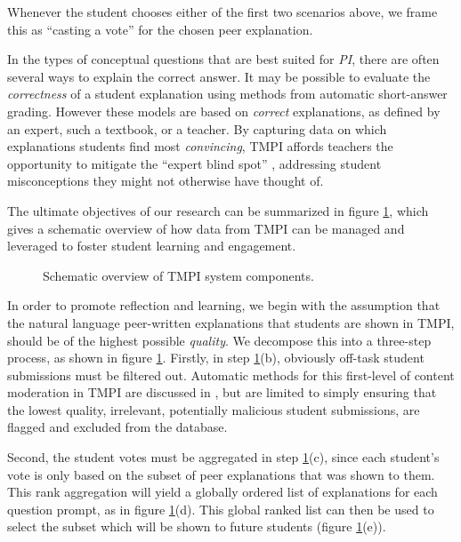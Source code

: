 \documentclass[notitlepage,12pt]{jedm}
\begin{document}
Whenever the student chooses either of the first two scenarios above, we 
frame this as ``casting a vote'' for the chosen peer explanation.

In the types of conceptual questions that are best suited for \textit{PI}, 
there are often several ways to explain the correct answer.
It may be possible to evaluate the \textit{correctness} of a student 
explanation using methods from automatic short-answer grading. 
However these models are based on \textit{correct} explanations, as defined by 
an expert, such a textbook, or a teacher.
By capturing data on which explanations students find most \textit{convincing}, 
TMPI affords teachers the opportunity to mitigate the ``expert blind spot'' 
\cite{nathan_expert_2001}, addressing student misconceptions they might not 
otherwise have thought of.

The ultimate objectives of our research can be summarized in figure  
\ref{fig:tmpi_research}, which gives a schematic overview of how data from TMPI 
can be managed and leveraged to foster student learning and engagement.
 
\begin{figure}[H]
	\centering
	\def\svgscale{0.70}
	
	\caption{
		Schematic overview of TMPI system components.
		 }
	\label{fig:tmpi_research}
\end{figure}

In order to promote reflection and learning, we begin with the assumption that 
the natural language peer-written explanations that students are shown in TMPI, 
should be of the highest possible \textit{quality}.
We decompose this into a three-step process, as shown in figure 
\ref{fig:tmpi_research}. 
Firstly, in step \ref{fig:tmpi_research}(b), obviously off-task 
student submissions must be filtered out. 
Automatic methods for this first-level of content moderation in TMPI are 
discussed in , but are limited to simply ensuring 
that the lowest quality, irrelevant, potentially malicious student submissions, 
are flagged and excluded from the database. 

Second, the student votes must be aggregated in step 
\ref{fig:tmpi_research}(c), since each student's vote is only based on the 
subset of peer explanations that was shown to them.
This rank aggregation will yield a globally ordered list of explanations for 
each question prompt, as in figure \ref{fig:tmpi_research}(d).
This global ranked list can then be used to select the subset which will be 
shown to future students (figure \ref{fig:tmpi_research}(e)).
\end{document}
